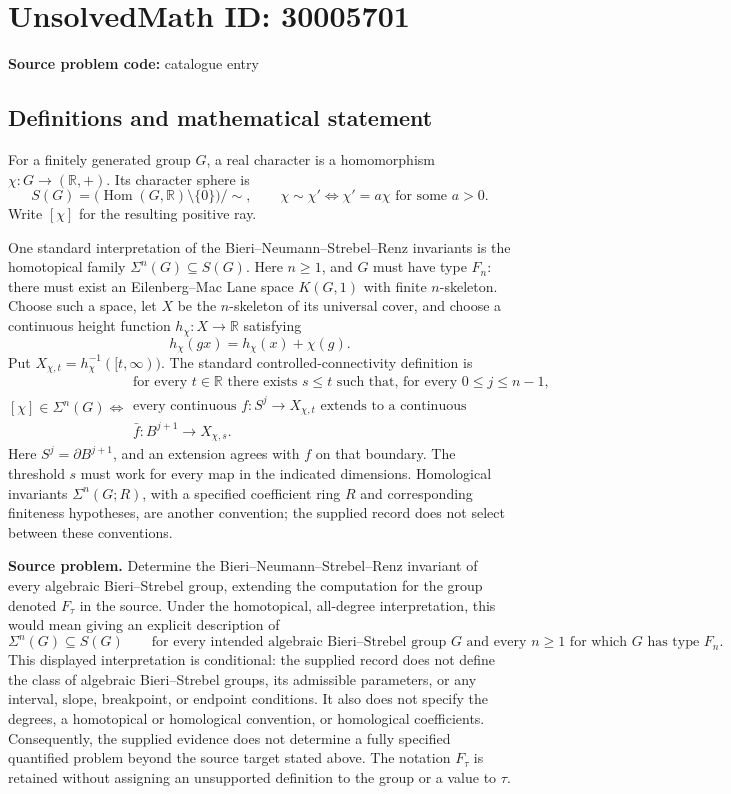 \documentclass[11pt]{article}
\newcommand{\R}{\mathbb{R}}
\begin{document}
\section*{UnsolvedMath ID: 30005701}
\textbf{Source problem code:} catalogue entry
\subsection{Definitions and mathematical statement}
For a finitely generated group \(G\), a real character is a homomorphism \(\chi:G\to(\R,+)\). Its character sphere is
\[
S(G)=\bigl(\operatorname{Hom}(G,\R)\setminus\{0\}\bigr)/{\sim},
\qquad \chi\sim\chi'\iff \chi'=a\chi\text{ for some }a>0.
\]
Write \([\chi]\) for the resulting positive ray.

One standard interpretation of the Bieri--Neumann--Strebel--Renz invariants is the homotopical family \(\Sigma^n(G)\subseteq S(G)\). Here \(n\geq1\), and \(G\) must have type \(F_n\): there must exist an Eilenberg--Mac Lane space \(K(G,1)\) with finite \(n\)-skeleton. Choose such a space, let \(X\) be the \(n\)-skeleton of its universal cover, and choose a continuous height function \(h_\chi:X\to\R\) satisfying
\[
h_\chi(gx)=h_\chi(x)+\chi(g).
\]
Put \(X_{\chi,t}=h_\chi^{-1}([t,\infty))\). The standard controlled-connectivity definition is
\[
[\chi]\in\Sigma^n(G)
\iff
\begin{gathered}
\text{for every }t\in\R\text{ there exists }s\leq t\text{ such that, for every }0\leq j\leq n-1,\\
\text{every continuous }f:S^j\to X_{\chi,t}\text{ extends to a continuous }\\
\bar f:B^{j+1}\to X_{\chi,s}.
\end{gathered}
\]
Here \(S^j=\partial B^{j+1}\), and an extension agrees with \(f\) on that boundary. The threshold \(s\) must work for every map in the indicated dimensions. Homological invariants \(\Sigma^n(G;R)\), with a specified coefficient ring \(R\) and corresponding finiteness hypotheses, are another convention; the supplied record does not select between these conventions.

\textbf{Source problem.} Determine the Bieri--Neumann--Strebel--Renz invariant of every algebraic Bieri--Strebel group, extending the computation for the group denoted \(F_\tau\) in the source. Under the homotopical, all-degree interpretation, this would mean giving an explicit description of
\[
\Sigma^n(G)\subseteq S(G)
\qquad\text{for every intended algebraic Bieri--Strebel group }G
\text{ and every }n\geq1\text{ for which }G\text{ has type }F_n.
\]
This displayed interpretation is conditional: the supplied record does not define the class of algebraic Bieri--Strebel groups, its admissible parameters, or any interval, slope, breakpoint, or endpoint conditions. It also does not specify the degrees, a homotopical or homological convention, or homological coefficients. Consequently, the supplied evidence does not determine a fully specified quantified problem beyond the source target stated above. The notation \(F_\tau\) is retained without assigning an unsupported definition to the group or a value to \(\tau\).
\end{document}

